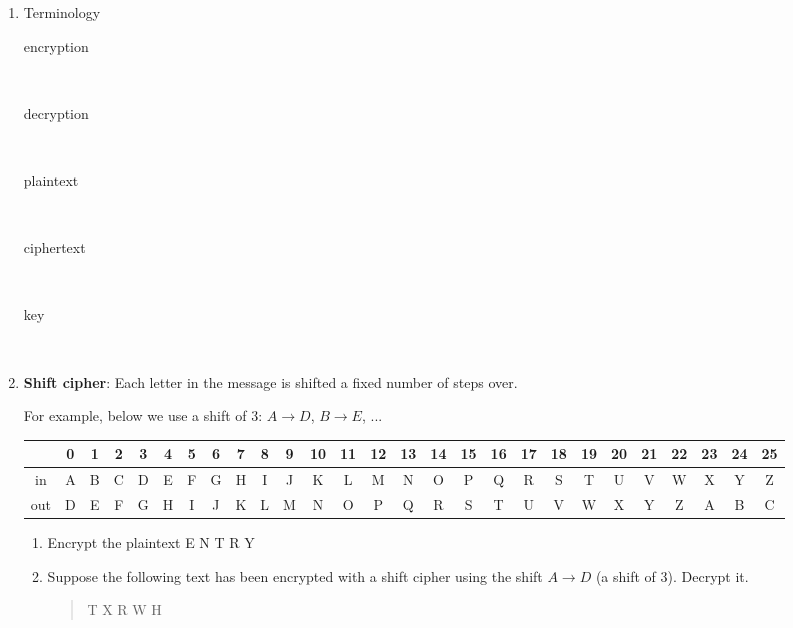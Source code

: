 \documentclass[12pt]{article}
\renewcommand{\emph}[1]{\textsf{\textbf{#1}}}
\newcommand{\be}{\begin{enumerate}}
\newcommand{\ee}{\end{enumerate}}
\begin{document}
\begin{enumerate}
\item Terminology
\begin{description}
\item[encryption] \
\vfill

\item[decryption] \ \vfill


\item[plaintext] \ \vfill

\item[ciphertext] \

\vfill

\item[key] \ \vfill

\end{description}

\item \emph{Shift cipher}: Each letter in the message is shifted a fixed number of  steps over.

For example, below we use a shift of 3:  $A \to D$, $B \to E$, ...

{\scriptsize
\hspace*{-1.5cm}
\begin{tabular}{|c|c|c|c|c|c|c|c|c|c|c|c|c|c|c|c|c|c|c|c|c|c|c|c|c|c|c|}
\hline
&0&1&2&3&4&5&6&7&8&9&10&11&12&13&14&15&16&17&18&19&20&21&22&23&24&25\\ \hline \hline
in& A&B&C&D&E&F&G&H&I&J&K&L&M&N&O&P&Q&R&S&T&U&V&W&X&Y&Z\\  \hline
out&D&E&F&G&H&I&J&K&L&M&N&O&P&Q&R&S&T&U&V&W&X&Y&Z&A&B&C\\
\hline
\end{tabular}
}

\be
\item Encrypt the plaintext \textsf{E N T R Y}

\vfill

\item Suppose the following text has been encrypted with a shift cipher using the shift $A \to D$ (a shift of 3). Decrypt it.
\begin{quote}\textsf{T X R W H} \end{quote}

\vfill

\ee
\end{enumerate}
\end{document}
